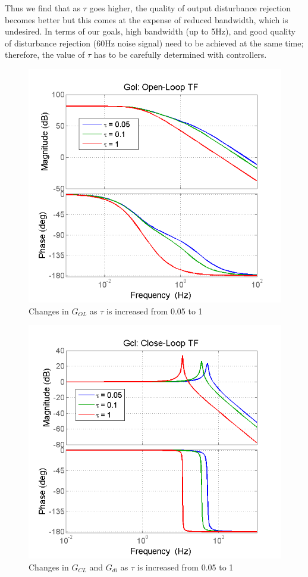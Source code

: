 \documentclass{article}
\theoremstyle{plain}
\theoremstyle{definition}
\theoremstyle{remark}
\begin{document}
Thus we find that as $\tau$ goes higher, the quality of output disturbance rejection becomes better but this comes at the expense of reduced bandwidth, which is undesired. In terms of our goals, high bandwidth (up to 5Hz), and good quality of disturbance rejection (60Hz noise signal) need to be achieved at the same time; therefore, the value of $\tau$ has to be carefully determined with controllers.

\begin{figure}[htb]
\begin{center}
\includegraphics[width = 10 cm]{q3_8}
\caption{Changes in $G_{OL}$ as $\tau$ is increased from 0.05 to 1}
\label{q3_8}
\end{center}
\end{figure}

\begin{figure}[htb]
\begin{center}
\includegraphics[width = 10 cm]{q3_9}
\caption{Changes in $G_{CL}$  and $G_{di}$ as $\tau$ is increased from 0.05 to 1}
\label{q3_9}
\end{center}
\end{figure}
\end{document}
